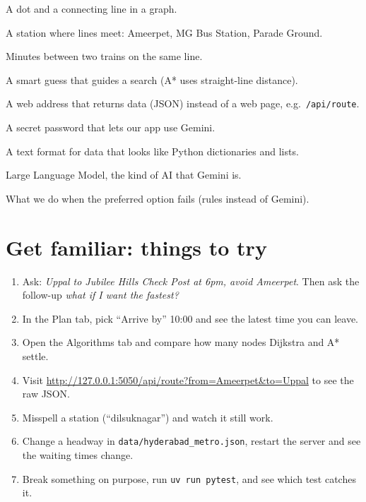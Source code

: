 \documentclass[11pt,a4paper]{article}
\newcommand{\file}[1]{\texttt{\color{accent}#1}}
\begin{document}
\begin{description}[itemsep=0.1em]
  \item[Node / edge] A dot and a connecting line in a graph.
  \item[Interchange] A station where lines meet: Ameerpet, MG Bus Station, Parade Ground.
  \item[Headway] Minutes between two trains on the same line.
  \item[Heuristic] A smart guess that guides a search (A* uses straight-line distance).
  \item[API] A web address that returns data (JSON) instead of a web page, e.g.\ \texttt{/api/route}.
  \item[API key] A secret password that lets our app use Gemini.
  \item[JSON] A text format for data that looks like Python dictionaries and lists.
  \item[LLM] Large Language Model, the kind of AI that Gemini is.
  \item[Fallback] What we do when the preferred option fails (rules instead of Gemini).
\end{description}

\section{Get familiar: things to try}

\begin{enumerate}
  \item Ask: \emph{Uppal to Jubilee Hills Check Post at 6pm, avoid Ameerpet}. Then ask the follow-up \emph{what if I want the fastest?}
  \item In the Plan tab, pick ``Arrive by'' 10:00 and see the latest time you can leave.
  \item Open the Algorithms tab and compare how many nodes Dijkstra and A* settle.
  \item Visit \url{http://127.0.0.1:5050/api/route?from=Ameerpet&to=Uppal} to see the raw JSON.
  \item Misspell a station (``dilsuknagar'') and watch it still work.
  \item Change a headway in \file{data/hyderabad\_metro.json}, restart the server and see the waiting times change.
  \item Break something on purpose, run \texttt{uv run pytest}, and see which test catches it.
\end{enumerate}
\end{document}
